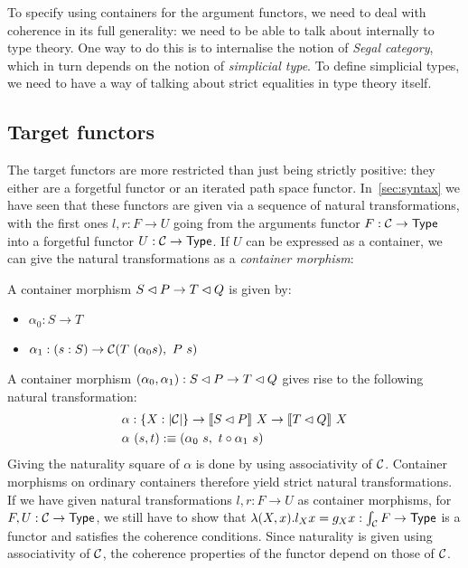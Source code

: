 \documentclass[a4paper,10pt]{article}
\begin{document}
To specify \hits using containers for the argument functors, we need
to deal with coherence in its full generality: we need to be able to
talk about \omegacats internally to type theory. One way to do this is
to internalise the notion of \emph{Segal category}, which in turn
depends on the notion of \emph{simplicial type}. To define simplicial
types, we need to have a way of talking about strict equalities in
type theory itself.

\subsection{Target functors}

The target functors are more restricted than just being strictly
positive: they either are a forgetful functor or an iterated path
space functor. In~\cref{sec:syntax} we have seen that these functors
are given via a sequence of natural transformations, with the first
ones $l, r : F \to U$ going from the arguments functor
$F : \mathcal{C} \to \mathsf{Type}$ into a forgetful functor $U : \mathcal{C} \to \mathsf{Type}$. If $U$
can be expressed as a container, we can give the natural
transformations as a \emph{container morphism}:

\begin{defn}
A container morphism $S \lhd P \to T \lhd Q$ is given by:
% 
\begin{itemize}
\item $\alpha_0 : S \to T$
\item $\alpha_1 : (s : S) \to \mathcal{C}(T\ (\alpha_0 s) ,\ P\ s)$
\end{itemize}
% 
\end{defn}

A container morphism
$(\alpha_0,\alpha_1) : S \lhd P \to T \lhd Q$ gives rise to the
following natural transformation:
%
\begin{align*}
  &\alpha : \{ X : | \mathcal{C} | \} \to \llbracket S \lhd P \rrbracket \ X \to \llbracket T \lhd Q \rrbracket \ X \\
  &\alpha\ (s , t) :\equiv ( \alpha_0\ s ,\ t \circ \alpha_1\ s )
\end{align*}
%
Giving the naturality square of $\alpha$ is done by using
associativity of $\mathcal{C}$. Container morphisms on ordinary containers
therefore yield strict natural transformations. If we have given
natural transformations $l, r : F \to U$ as container morphisms, for
$F, U : \mathcal{C} \to \mathsf{Type}$, we still have to show that
$\lambda (X , x) . l_X x = g_X x : \int_{\mathcal{C}} F \to \mathsf{Type}$ is a functor
and satisfies the coherence conditions. Since naturality is given
using associativity of $\mathcal{C}$, the coherence properties of the functor
depend on those of $\mathcal{C}$.
\end{document}
